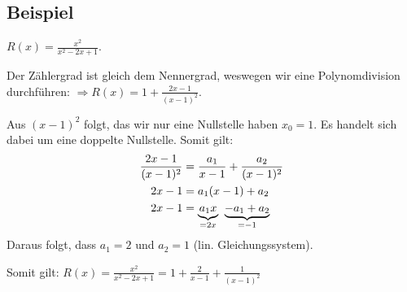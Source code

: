 \subsection*{Beispiel}
$R(x) = \frac{x^2}{x^2-2x+1}$.

Der Zählergrad ist gleich dem Nennergrad,
weswegen wir eine Polynomdivision durchführen: $\Rightarrow R(x) = 1 +
\frac{2x-1}{(x-1)^2}$.

Aus $(x-1)^2$ folgt, das wir nur eine Nullstelle haben $x_0 = 1$. Es handelt
sich dabei um eine doppelte Nullstelle. Somit gilt:
\begin{align*}
\frac{2x-1}{(x-1)^2} &= \frac{a_1}{x-1} + \frac{a_2}{(x-1)^2}\\
2x-1 &= a_1(x-1) + a_2\\
2x-1 &= \underset{= 2x}{\underbrace{a_1 x}} \;\; \underset{= -1 }{\underbrace{- a_1 + a_2}}
\end{align*}
Daraus folgt, dass $a_1 = 2$ und $a_2 = 1$ (lin. Gleichungssystem).

Somit gilt: $R(x) = \frac{x^2}{x^2-2x+1} = 1 + \frac{2}{x-1} +
\frac{1}{(x-1)^2}$
